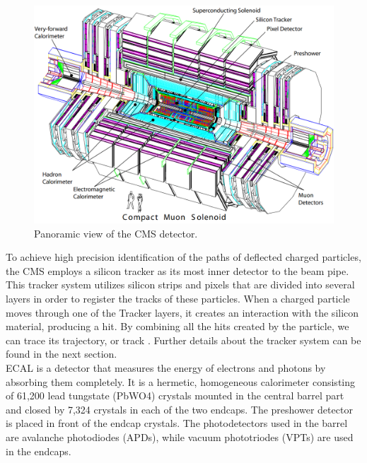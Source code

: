 \begin{center}
  \begin{figure}[ht]
    \centering
    \includegraphics[scale=.3]{Chapter2/CMS_detector_simple.png}
    \caption[Panoramic view of the CMS detector]{Panoramic view of the CMS detector.}
    \label{detector_CMS}
  \end{figure}
\end{center}

To achieve high precision identification of the paths of deflected charged particles, the CMS employs a silicon tracker as its most inner detector to the beam pipe. This tracker system utilizes silicon strips and pixels that are divided into several layers in order to register the tracks of these particles. When a charged particle moves through one of the Tracker layers, it creates an interaction with the silicon material, producing a hit. By combining all the hits created by the particle, we can trace its trajectory, or track \cite{CMS_Exp_2008}. Further details about the tracker system can be found in the next section.\\

ECAL is a detector that measures the energy of electrons and photons by absorbing them completely. It is a hermetic, homogeneous calorimeter consisting of 61,200 lead tungstate (PbWO4) crystals mounted in the central barrel part and closed by 7,324 crystals in each of the two endcaps. The preshower detector is placed in front of the endcap crystals. The photodetectors used in the barrel are avalanche photodiodes (APDs), while vacuum phototriodes (VPTs) are used in the endcaps.\\ 

